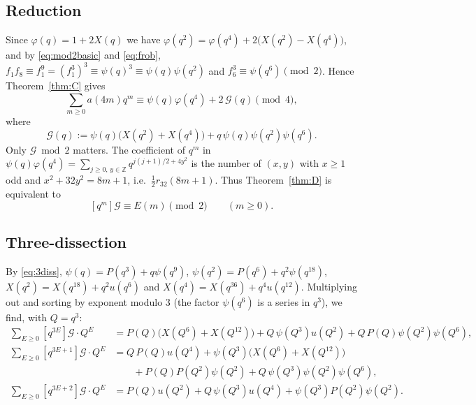 \documentclass[11pt]{amsart}
\theoremstyle{definition}
\theoremstyle{remark}
\numberwithin{equation}{section}
\newcommand{\Z}{\mathbb{Z}}
\begin{document}
\subsection{Reduction}
Since $\varphi(q)=1+2X(q)$ we have $\varphi(q^2)=\varphi(q^4)+2\big(X(q^2)-X(q^4)\big)$, and by \eqref{eq:mod2basic} and \eqref{eq:frob}, $f_1f_8\equiv f_1^9=(f_1^3)^3\equiv\psi(q)^3\equiv\psi(q)\psi(q^2)$ and $f_6^3\equiv\psi(q^6)\pmod 2$. Hence Theorem~\ref{thm:C} gives
\begin{equation}\label{eq:reduction}
\sum_{m\ge0}a(4m)q^m\equiv\psi(q)\varphi(q^4)+2\,\mathcal G(q)\pmod 4,
\end{equation}
where
\[
\mathcal G(q):=\psi(q)\big(X(q^2)+X(q^4)\big)+q\,\psi(q)\psi(q^2)\psi(q^6).
\]
Only $\mathcal G\bmod 2$ matters. The coefficient of $q^m$ in $\psi(q)\varphi(q^4)=\sum_{j\ge0,\,y\in\Z}q^{j(j+1)/2+4y^2}$ is the number of $(x,y)$ with $x\ge1$ odd and $x^2+32y^2=8m+1$, i.e.\ $\frac12 r_{32}(8m+1)$. Thus Theorem~\ref{thm:D} is equivalent to
\begin{equation}\label{eq:Gclaim}
[q^m]\mathcal G\equiv E(m)\pmod 2\qquad(m\ge0).
\end{equation}

\subsection{Three-dissection}
By \eqref{eq:3diss}, $\psi(q)=P(q^3)+q\psi(q^9)$, $\psi(q^2)=P(q^6)+q^2\psi(q^{18})$, $X(q^2)=X(q^{18})+q^2u(q^6)$ and $X(q^4)=X(q^{36})+q^4u(q^{12})$. Multiplying out and sorting by exponent modulo $3$ (the factor $\psi(q^6)$ is a series in $q^3$), we find, with $Q=q^3$:
\begin{align*}
\sum_{E\ge0}[q^{3E}]\mathcal G\cdot Q^{E}&=P(Q)\big(X(Q^6)+X(Q^{12})\big)+Q\,\psi(Q^3)u(Q^2)+Q\,P(Q)\psi(Q^2)\psi(Q^6),\\
\sum_{E\ge0}[q^{3E+1}]\mathcal G\cdot Q^{E}&=Q\,P(Q)u(Q^4)+\psi(Q^3)\big(X(Q^6)+X(Q^{12})\big)\\&\qquad+P(Q)P(Q^2)\psi(Q^2)+Q\,\psi(Q^3)\psi(Q^2)\psi(Q^6),\\
\sum_{E\ge0}[q^{3E+2}]\mathcal G\cdot Q^{E}&=P(Q)u(Q^2)+Q\,\psi(Q^3)u(Q^4)+\psi(Q^3)P(Q^2)\psi(Q^2).
\end{align*}
\end{document}
